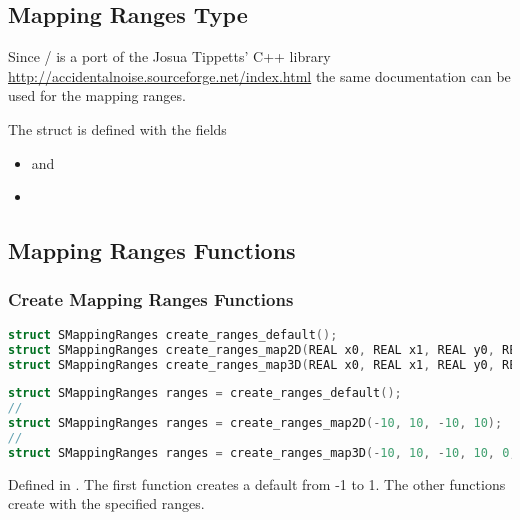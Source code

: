 \subsection{Mapping Ranges Type}

Since \ANLOpenCL/ is a port of the Josua Tippetts' C++ library
\url{http://accidentalnoise.sourceforge.net/index.html} the same documentation
can be used for the mapping ranges.

The struct  is defined with the fields
\begin{itemize}
\item {} and
\item {}
\end{itemize}

\subsection{Mapping Ranges Functions}

\subsubsection{Create Mapping Ranges Functions}

\begin{lstlisting}[caption={Definition of create ranges functions},label={lst:create_ranges_definition},language=OpenCL]
struct SMappingRanges create_ranges_default();
struct SMappingRanges create_ranges_map2D(REAL x0, REAL x1, REAL y0, REAL y1);
struct SMappingRanges create_ranges_map3D(REAL x0, REAL x1, REAL y0, REAL y1, REAL z0, REAL z1)
\end{lstlisting}

\begin{lstlisting}[caption={Example for create ranges functions},label={lst:create_ranges_example},language=OpenCL]
struct SMappingRanges ranges = create_ranges_default();
//
struct SMappingRanges ranges = create_ranges_map2D(-10, 10, -10, 10);
//
struct SMappingRanges ranges = create_ranges_map3D(-10, 10, -10, 10, 0, 1);
\end{lstlisting}

Defined in .
The first function creates a default  from -1 to 1.
The other functions create  with the specified ranges.

